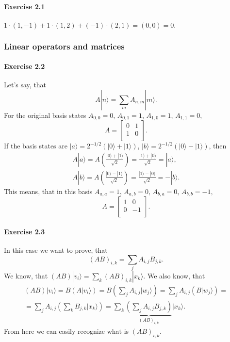 \documentclass[a4paper,12pt]{article}
\newcommand{\exercise}[1]{\paragraph{Exercise #1}}
\newcommand{\ra}{\rangle}
\begin{document}
    \exercise{2.1} $1 \cdot (1, -1) + 1 \cdot (1, 2) + (-1) \cdot (2, 1) = (0, 0) = 0$.

    \subsubsection{Linear operators and matrices}

    \exercise{2.2} Let's say, that
    \begin{equation}
        A | n \ra = \sum_m A_{n, m} | m \ra \textrm{.}
    \end{equation}
    For the original basis states $A_{0, 0} = 0$, $A_{0, 1} = 1$, $A_{1, 0} = 1$, $A_{1, 1} = 0$,
    \begin{equation}
        A =
        \begin{bmatrix}
            0 & 1 \\
            1 & 0 \\
        \end{bmatrix} \textrm{.}
    \end{equation}
    If the basis states are $| a \ra = 2 ^ {-1/2}(| 0 \ra + | 1 \ra)$, $| b \ra = 2 ^ {-1/2}(| 0 \ra - | 1 \ra)$, then
    \begin{gather}
        A | a \ra = A \left( \frac{ | 0 \ra + | 1 \ra }{\sqrt{2}} \right) = \frac{ | 1 \ra + | 0 \ra }{\sqrt{2}} = | a \ra \textrm{,} \\
        A | b \ra = A \left( \frac{ | 0 \ra - | 1 \ra }{\sqrt{2}} \right) = \frac{ | 1 \ra - | 0 \ra }{\sqrt{2}} = - | b \ra \textrm{.}
    \end{gather}
    This means, that in this basis $A_{a, a} = 1$, $A_{a, b} = 0$, $A_{b, a} = 0$, $A_{b, b} = -1$,
    \begin{equation}
        A =
        \begin{bmatrix}
            1 & 0 \\
            0 & -1 \\
        \end{bmatrix} \textrm{.}
    \end{equation}

    \exercise{2.3} In this case we want to prove, that
    \begin{equation}
        (AB)_{i, k} = \sum_j A_{i, j} B_{j, k} \textrm{.}
    \end{equation}
    We know, that $(AB) | v_i \ra = \sum_k (AB)_{i, k} | x_k \ra$. We also know, that
    \begin{gather}
        \nonumber
        (AB) | v_i \ra = B (A | v_i \ra) = B \left( \sum_j A_{i, j} | w_j \ra \right) = \sum_j A_{i, j} (B | w_j \ra) =\\
        = \sum_j A_{i, j} \left( \sum_k B_{j, k} | x_k \ra \right) = \sum_k \underbrace{\left( \sum_j A_{i, j} B_{j, k} \right)}_{(AB)_{i, k}} | x_k \ra \textrm{.}
    \end{gather}
    From here we can easily recognize what is $(AB)_{i, k}$.
\end{document}
